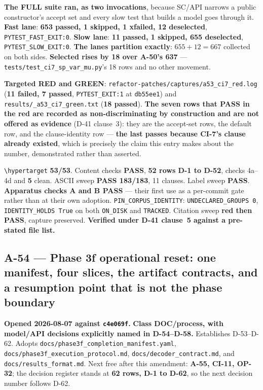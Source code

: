 \documentclass[
  10pt,
]{article}
\begin{document}
\textbf{The FULL suite ran, as two invocations}, because SC/API narrows a public constructor's accept set and every slow test that builds a model goes through it. \textbf{Fast lane}: \textbf{653 passed, 1 skipped, 1 xfailed, 12 deselected}, \texttt{PYTEST\_FAST\_EXIT:0}. \textbf{Slow lane}: \textbf{11 passed, 1 skipped, 655 deselected}, \texttt{PYTEST\_SLOW\_EXIT:0}. \textbf{The lanes partition exactly}: $655 + 12 = 667$ collected on both sides. \textbf{Selected rises by 18 over A-50's 637} --- \texttt{tests/\allowbreak{}test\_ci7\_sp\_var\_mu.py}'s 18 rows and no other movement.

\textbf{Targeted RED and GREEN}: \texttt{refactor-patches/\allowbreak{}captures/\allowbreak{}a53\_ci7\_red.log} (\textbf{11 failed, 7 passed}, \texttt{PYTEST\_EXIT:1} at \texttt{db55ee1}) and \texttt{results/\allowbreak{}\_a53\_ci7\_green.txt} (\textbf{18 passed}). \textbf{The seven rows that PASS in the red are recorded as non-discriminating by construction and are not offered as evidence} (D-41 clause~3): they are the accept-set rows, the default row, and the clause-identity row --- \textbf{the last passes because CI-7's clause already existed}, which is precisely the claim this entry makes about the number, demonstrated rather than asserted.

\texttt{\textbackslash hypertarget} \textbf{53/53}. Content checks \textbf{PASS}, \textbf{52 rows D-1 to D-52}, checks 4a--4d and \textbf{5} clean. ASCII sweep \textbf{PASS 183/183}, 11 clauses. Label sweep \textbf{PASS}. \textbf{Apparatus checks A and B PASS} --- their first use as a per-commit gate rather than at their own adoption. \texttt{PIN\_CORPUS\_IDENTITY}: \texttt{UNDECLARED\_GROUPS 0}, \texttt{IDENTITY\_HOLDS True} on both \texttt{ON\_DISK} and \texttt{TRACKED}. Citation sweep \textbf{red then PASS}, capture preserved. \textbf{Verified under D-41 clause~5 against a pre-stated file list.}

\hypertarget{a-54}{%
\subsection{A-54 --- Phase 3f operational reset: one manifest, four slices, the
artifact contracts, and a resumption point that is not the phase
boundary}\label{a-54}}

\textbf{Opened 2026-08-07 against \texttt{c4e069f}.}
\textbf{Class DOC/process, with model/API decisions explicitly named in
D-54--D-58.} Establishes D-53--D-62. Adopts
\texttt{docs/phase3f\_completion\_manifest.yaml},
\texttt{docs/phase3f\_execution\_protocol.md},
\texttt{docs/decoder\_contract.md}, and
\texttt{docs/results\_format.md}. Next free after this amendment:
\textbf{A-55, CI-11, OP-32}; the decision register stands at \textbf{62 rows, D-1 to D-62}, so the next decision number follows D-62.
\end{document}
